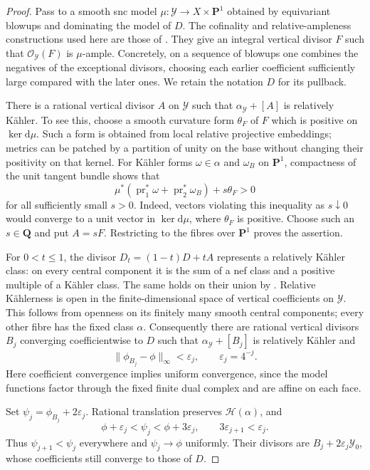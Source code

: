 \begin{proof}
Pass to a smooth snc model $\mu:\mathcal Y\to X\times\mathbf P^1$
obtained by equivariant blowups and dominating the model of $D$.
The cofinality and relative-ampleness constructions used here are those
of \cite[Remark~2.5.2 and the proof of Theorem~2.6.4]{MPTropicalV2}.  They give an integral vertical divisor $F$
such that $\mathcal O_{\mathcal Y}(F)$ is $\mu$-ample.  Concretely, on
a sequence of blowups one combines the negatives of the exceptional
divisors, choosing each earlier coefficient sufficiently large compared
with the later ones.  We retain the notation $D$ for its pullback.

There is a rational vertical divisor $A$ on $\mathcal Y$ such that
$\alpha_{\mathcal Y}+[A]$ is relatively K\"ahler.  To see this, choose
a smooth curvature form $\theta_F$ of $F$ which is positive on
$\ker\mathrm d\mu$.  Such a form is obtained from local relative
projective embeddings; metrics can be patched by a partition of unity
on the base without changing their positivity on that kernel.
For K\"ahler forms $\omega\in\alpha$ and $\omega_B$ on $\mathbf P^1$,
compactness of the unit tangent bundle shows that
\[
 \mu^*(\operatorname{pr}_1^*\omega+
             \operatorname{pr}_2^*\omega_B)+s\theta_F>0
\]
for all sufficiently small $s>0$.  Indeed, vectors violating this
inequality as $s\downarrow0$ would converge to a unit vector in
$\ker\mathrm d\mu$, where $\theta_F$ is positive.  Choose such an
$s\in\mathbf Q$ and put $A=sF$.  Restricting to the fibres over
$\mathbf P^1$ proves the assertion.

For $0<t\leq1$, the divisor $D_t=(1-t)D+tA$ represents a relatively
K\"ahler class: on every central component it is the sum of a nef
class and a positive multiple of a K\"ahler class.  The same holds on
their union by \cite[Proposition~3.3(ii)]{DP04}.  Relative K\"ahlerness
is open in the finite-dimensional space of vertical coefficients on
$\mathcal Y$.  This follows from openness on its finitely many smooth
central components; every other fibre has the fixed class $\alpha$.
Consequently there are rational vertical divisors $B_j$ converging
coefficientwise to $D$ such that $\alpha_{\mathcal Y}+[B_j]$ is
relatively K\"ahler and
\[
        \|\phi_{B_j}-\phi\|_\infty<\varepsilon_j,
        \qquad \varepsilon_j=4^{-j}.
\]
Here coefficient convergence implies uniform convergence, since the
model functions factor through the fixed finite dual complex and are
affine on each face.

Set $\psi_j=\phi_{B_j}+2\varepsilon_j$.  Rational translation preserves
$\mathcal H(\alpha)$, and
\[
 \phi+\varepsilon_j<\psi_j<\phi+3\varepsilon_j,
 \qquad 3\varepsilon_{j+1}<\varepsilon_j.
\]
Thus $\psi_{j+1}<\psi_j$ everywhere and $\psi_j\to\phi$ uniformly.
Their divisors are $B_j+2\varepsilon_j\mathcal Y_0$, whose coefficients
still converge to those of $D$.
\end{proof}

